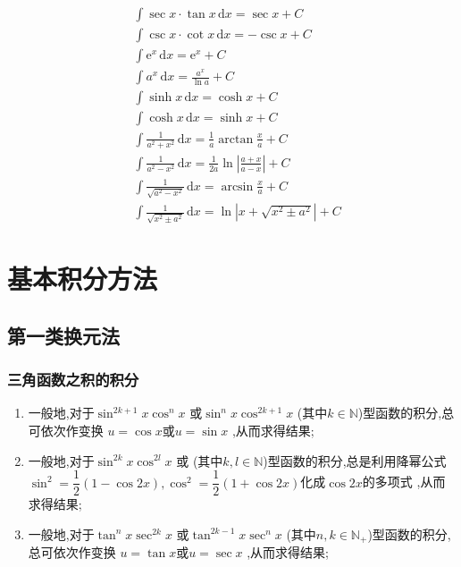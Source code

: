 \documentclass[10pt,a4paper]{article}
\begin{document}
\begin{align}
     & \int \sec x\cdot\tan x \,\mathrm{d}x=\sec x+C                                                                          \\[7pt]
     & \int\csc x \cdot\cot x \,\mathrm{d}x=-\csc x+C                                                                         \\[7pt]
     & \int \mathrm{e}^x \,\mathrm{d}x=\mathrm{e}^x+C                                                                         \\[7pt]
     & \int a^x\,\mathrm{d}x=\frac{a^x}{\ln a}+C                                                                              \\[7pt]
     & \int \sinh x\,\mathrm{d}x=\cosh x+C                                                                                    \\[7pt]
     & \int \cosh x\,\mathrm{d}x=\sinh x+C                                                                                    \\[7pt]
     & \int \frac{1}{a^2+x^2}\,\mathrm{d}x=\frac{1}{a}\arctan\frac{x}{a}+C                                                    \\[7pt]
     & \int \frac{1}{a^2-x^2}\,\mathrm{d}x=\frac{1}{2a}\ln \left|\frac{a+x}{a-x}\right|+C                                     \\[7pt]
     & \int \frac{1}{\sqrt{a^2-x^2}}\,\mathrm{d}x=\arcsin\frac{x}{a}+C                                                        \\[7pt]
     & \int \frac{1}{\sqrt{x^2\pm a^2}}\,\mathrm{d}x=\ln \left|x+\sqrt{x^2\pm a^2}\right|+C
\end{align}
\section{基本积分方法}
\subsection{第一类换元法}
\subsubsection{三角函数之积的积分}
\begin{enumerate}
    \item 一般地,对于$ \sin^{2k+1}x\cos^n x $ 或$ \sin^n x \cos^{2k+1}x $ (其中$ k\in\mathbb{N} $)型函数的积分,总可依次作变换 $ u=\cos x $或$ u=\sin x $ ,从而求得结果;
    \item 一般地,对于$ \sin^{2k}x\cos^{2l}x $ 或 (其中$ k,l\in \mathbb{N} $)型函数的积分,总是利用降幂公式$ \sin^2=\dfrac{1}{2}(1-\cos 2x),
              \cos^2=\dfrac{1}{2}(1+\cos 2x) $化成$ \cos 2x $的多项式 ,从而求得结果;
    \item 一般地,对于$ \tan^{n}x\sec^{2k} x $ 或$ \tan^{2k-1} x \sec^{n}x $ (其中$ n,k\in\mathbb{N}_{+} $)型函数的积分,总可依次作变换 $ u=\tan x $或$ u=\sec x $ ,从而求得结果;
\end{enumerate}
\end{document}
